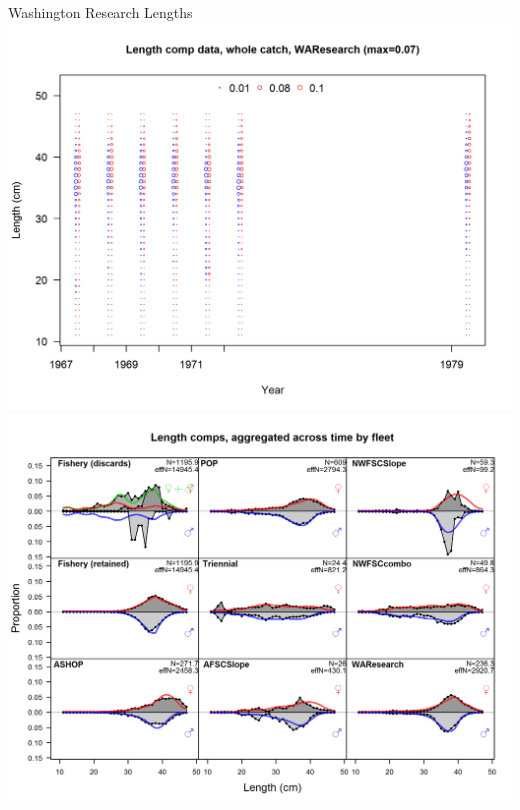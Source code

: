 \documentclass[pdf]{beamer}\usepackage[]{graphicx}\usepackage[]{color}
\begin{document}
\begin{frame}{Washington Research Lengths}
  \includegraphics[scale = 0.37]{figures/WA_research_lengths.png}
  \includegraphics[scale = 0.37]{figures/WA_research_aggregate.png}
\end{frame}
\end{document}
